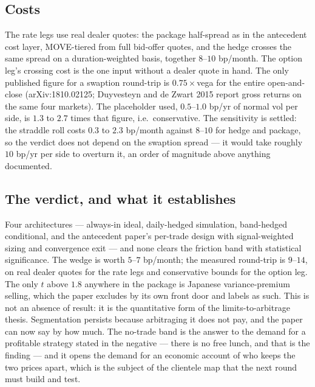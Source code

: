 \documentclass[11pt]{article}
\begin{document}
\subsection{Costs}\label{sec:strat-costs}
The rate legs use real dealer quotes: the package half-spread as in the antecedent cost layer,
MOVE-tiered from full bid-offer quotes, and the hedge crosses the same spread on a duration-weighted
basis, together $8$--$10$ bp/month. The option leg's crossing cost is the one input without a dealer
quote in hand. The only published figure for a swaption round-trip is $0.75\times$vega for the entire
open-and-close (arXiv:1810.02125; Duyvesteyn and de Zwart 2015 report gross returns on the same four
markets). The placeholder used, $0.5$--$1.0$ bp/yr of normal vol per side, is $1.3$ to $2.7$ times
that figure, i.e.\ conservative. The sensitivity is settled: the straddle roll costs $0.3$ to $2.3$
bp/month against $8$--$10$ for hedge and package, so the verdict does not depend on the swaption
spread --- it would take roughly $10$ bp/yr per side to overturn it, an order of magnitude above
anything documented.

\subsection{The verdict, and what it establishes}\label{sec:strat-verdict}
Four architectures --- always-in ideal, daily-hedged simulation, band-hedged conditional, and the
antecedent paper's per-trade design with signal-weighted sizing and convergence exit --- and none
clears the friction band with statistical significance. The wedge is worth $5$--$7$ bp/month; the
measured round-trip is $9$--$14$, on real dealer quotes for the rate legs and conservative bounds for
the option leg. The only $t$ above $1.8$ anywhere in the package is Japanese variance-premium selling,
which the paper excludes by its own front door and labels as such. This is not an absence of result:
it is the quantitative form of the limits-to-arbitrage thesis. Segmentation persists because
arbitraging it does not pay, and the paper can now say by how much. The no-trade band is the answer to
the demand for a profitable strategy stated in the negative --- there is no free lunch, and that is the
finding --- and it opens the demand for an economic account of who keeps the two prices apart, which
is the subject of the clientele map that the next round must build and test.
\end{document}
